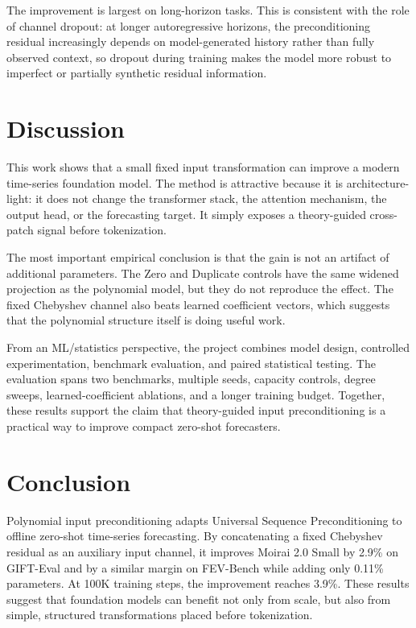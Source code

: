 \documentclass[11pt]{article}
\begin{document}
The improvement is largest on long-horizon tasks. This is consistent with the role of channel dropout: at longer autoregressive horizons, the preconditioning residual increasingly depends on model-generated history rather than fully observed context, so dropout during training makes the model more robust to imperfect or partially synthetic residual information.

\section{Discussion}

This work shows that a small fixed input transformation can improve a modern time-series foundation model. The method is attractive because it is architecture-light: it does not change the transformer stack, the attention mechanism, the output head, or the forecasting target. It simply exposes a theory-guided cross-patch signal before tokenization.

The most important empirical conclusion is that the gain is not an artifact of additional parameters. The Zero and Duplicate controls have the same widened projection as the polynomial model, but they do not reproduce the effect. The fixed Chebyshev channel also beats learned coefficient vectors, which suggests that the polynomial structure itself is doing useful work.

From an ML/statistics perspective, the project combines model design, controlled experimentation, benchmark evaluation, and paired statistical testing. The evaluation spans two benchmarks, multiple seeds, capacity controls, degree sweeps, learned-coefficient ablations, and a longer training budget. Together, these results support the claim that theory-guided input preconditioning is a practical way to improve compact zero-shot forecasters.

\section{Conclusion}

Polynomial input preconditioning adapts Universal Sequence Preconditioning to offline zero-shot time-series forecasting. By concatenating a fixed Chebyshev residual as an auxiliary input channel, it improves Moirai 2.0 Small by 2.9\% on GIFT-Eval and by a similar margin on FEV-Bench while adding only 0.11\% parameters. At 100K training steps, the improvement reaches 3.9\%. These results suggest that foundation models can benefit not only from scale, but also from simple, structured transformations placed before tokenization.
\end{document}
